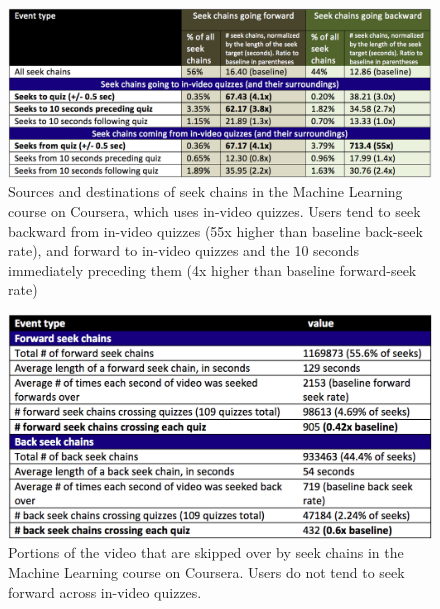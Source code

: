 \documentclass{sigchi}
\begin{document}
\begin{figure}
\includegraphics[width=1.0\columnwidth]{seek-sources-and-destinations-short}
\caption{Sources and destinations of seek chains in the Machine Learning course on Coursera, which uses in-video quizzes. Users tend to seek backward from in-video quizzes (55x higher than baseline back-seek rate), and forward to in-video quizzes and the 10 seconds immediately preceding them (4x higher than baseline forward-seek rate)}
\label{fig:seek-sources-and-destinations-short}
\end{figure}

\begin{figure}
\includegraphics[width=1.0\columnwidth]{table-of-seeks-short}
\caption{Portions of the video that are skipped over by seek chains in the Machine Learning course on Coursera. Users do not tend to seek forward across in-video quizzes.}
\label{fig:table-of-seeks-short}
\end{figure}
\end{document}
